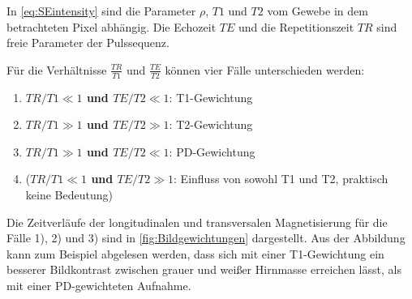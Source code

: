 In \autoref{eq:SEintensity} sind die Parameter $\rho$, $T1$ und $T2$ vom Gewebe in dem betrachteten Pixel abhängig. Die Echozeit $TE$ und die Repetitionszeit $TR$ sind freie Parameter der Pulssequenz.

Für die Verhältnisse $\frac{TR}{T1}$ und $\frac{TE}{T2}$ können vier Fälle unterschieden werden:

\begin{enumerate}
	\item \textbf{$TR/T1\ll1$ und $TE/T2\ll1$}: T1-Gewichtung
	\item \textbf{$TR/T1\gg1$ und $TE/T2\gg1$}: T2-Gewichtung
	\item \textbf{$TR/T1\gg1$ und $TE/T2\ll1$}: PD-Gewichtung
	\item (\textbf{$TR/T1\ll1$ und $TE/T2\gg1$}: Einfluss von sowohl T1 und T2, praktisch keine Bedeutung)
\end{enumerate}
Die Zeitverläufe der longitudinalen und transversalen Magnetisierung für die Fälle 1), 2) und 3) sind in \autoref{fig:Bildgewichtungen} dargestellt. Aus der Abbildung kann zum Beispiel abgelesen werden, dass sich mit einer T1-Gewichtung ein besserer Bildkontrast zwischen grauer und weißer Hirnmasse erreichen lässt, als mit einer PD-gewichteten Aufnahme.

